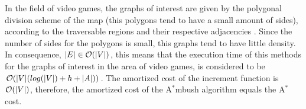 In the field of video games, the graphs of interest are
given by the polygonal division scheme of the map
\cite{book3,art1} (this polygons tend to have a small
amount of sides), according to the traversable regions 
and their respective adjacencies \cite{book3,art1}. 
Since the number of sides for the polygons is small, this 
graphs tend to have little density. In consequence,
$|E| \in \mathcal{O}(|V|)$, this means that the execution 
time of this methods for the graphs of interest in the
area of video games, is considered to be
$\mathcal{O}(|V|(log(|V|) + h + |A|) )$. 
The amortized cost of the increment function is $\mathcal{O}(|V|)$,
therefore, the amortized cost of the A$^*$mbush algorithm
equals the A$^*$ cost.

